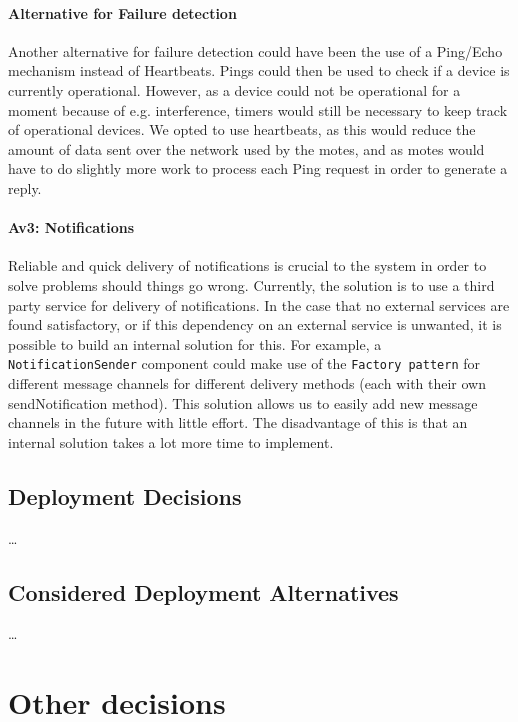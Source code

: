         \paragraph{Alternative for Failure detection}
            Another alternative for failure detection could have been the use of
            a Ping/Echo mechanism instead of Heartbeats. Pings could then be used
            to check if a device is currently operational. However, as a device could
            not be operational for a moment because of e.g. interference, timers
            would still be necessary to keep track of operational devices. We opted
            to use heartbeats, as this would reduce the amount of data sent over
            the network used by the motes, and as motes would have to do slightly
            more work to process each Ping request in order to generate a reply.

        \paragraph{Av3: Notifications}
            Reliable and quick delivery of notifications is crucial to the
            system in order to solve problems should things go wrong. Currently,
            the solution is to use a third party service for delivery of
            notifications. In the case that no external services are found
            satisfactory, or if this dependency on an external service is
            unwanted, it is possible to build an internal solution for this.
            For example, a \texttt{NotificationSender} component could make use
            of the \texttt{Factory pattern} for different message channels for
            different delivery methods (each with their own sendNotification method).
            This solution allows us to easily add new message channels in the
            future with little effort. The disadvantage of this is that an
            internal solution takes a lot more time to implement.


    \subsection*{Deployment Decisions}
    \ldots

    \subsection*{Considered Deployment Alternatives}
    \ldots

\section{Other decisions}
